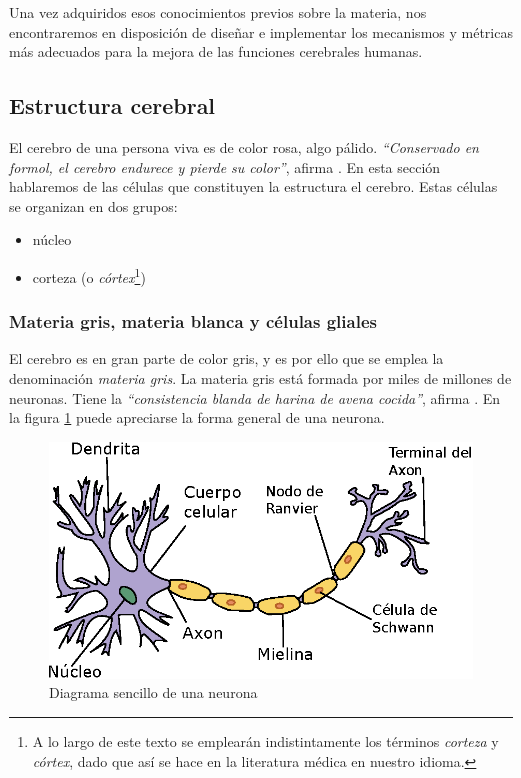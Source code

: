 Una vez adquiridos esos conocimientos previos sobre la materia, nos encontraremos en disposición de diseñar e implementar los mecanismos y métricas más adecuados para la mejora de las funciones cerebrales humanas.

\subsection{Estructura cerebral}

El cerebro de una persona viva es de color rosa, algo pálido. {\it ``Conservado en formol, el cerebro endurece y pierde su color''}, afirma \cite{Czerner2001}. En esta sección hablaremos de las células que constituyen la estructura el cerebro. Estas células se organizan en dos grupos:


\begin{itemize}
\item núcleo
\item corteza (o {\it córtex}\footnote{A lo largo de este texto se emplearán indistintamente los términos \emph{corteza} y \emph{córtex}, dado que así se hace en la literatura médica en nuestro idioma.})
\end{itemize}


\subsubsection{Materia gris, materia blanca y células gliales}

El cerebro es en gran parte de color gris, y es por ello que se emplea la denominación {\it materia gris}. La materia gris está formada por miles de millones de neuronas. Tiene la {\it ``consistencia blanda de harina de avena cocida''}, afirma \cite{Czerner2001}. En la figura \ref{diagrama_neurona} puede apreciarse la forma general de una neurona.


\begin{figure}[h]
  \begin{center}
    \includegraphics[scale=1]{images/neurona.eps}
    \caption{Diagrama sencillo de una neurona}
    \label{diagrama_neurona}
  \end{center}
\end{figure}


